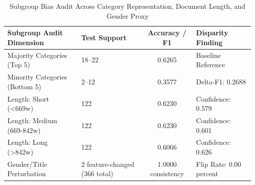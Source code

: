 \begin{table}
\caption{Subgroup Bias Audit Across Category Representation, Document Length, and Gender Proxy}
\label{tab:bias_audit_dual_branch_net}
\begin{tabular}{llcl}
\toprule
Subgroup Audit Dimension & Test Support & Accuracy / F1 & Disparity Finding \\
\midrule
Majority Categories (Top 5) & 18--22 & 0.6265 & Baseline Reference \\
Minority Categories (Bottom 5) & 2--12 & 0.3577 & Delta-F1: 0.2688 \\
Length: Short (<669w) & 122 & 0.6230 & Confidence: 0.579 \\
Length: Medium (669-842w) & 122 & 0.6230 & Confidence: 0.601 \\
Length: Long (>842w) & 122 & 0.6066 & Confidence: 0.626 \\
Gender/Title Perturbation & 2 feature-changed (366 total) & 1.0000 consistency & Flip Rate: 0.00 percent \\
\bottomrule
\end{tabular}
\end{table}
